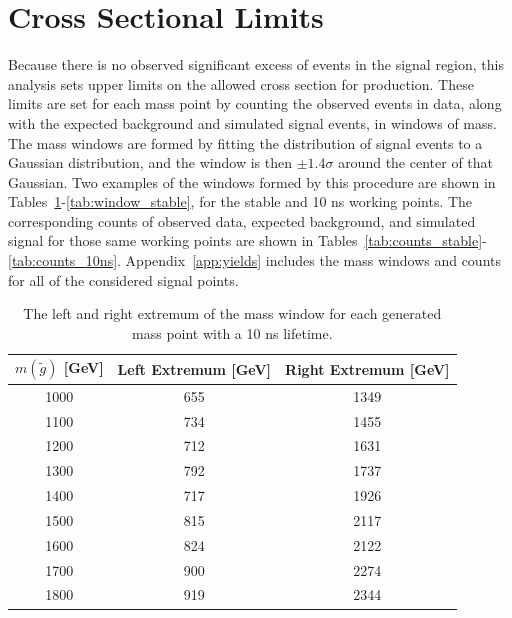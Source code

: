 
\section{Cross Sectional Limits}

Because there is no observed significant excess of events in the signal region, this analysis sets upper limits on the allowed cross section for \rhadron production.
These limits are set for each mass point by counting the observed events in data, along with the expected background and simulated signal events, in windows of mass.
The mass windows are formed by fitting the distribution of signal events to a Gaussian distribution, and the window is then $\pm 1.4\sigma$ around the center of that Gaussian.
Two examples of the windows formed by this procedure are shown in Tables~\ref{tab:window_10ns}-\ref{tab:window_stable}, for the stable and 10 ns working points.
The corresponding counts of observed data, expected background, and simulated signal for those same working points are shown in Tables~\ref{tab:counts_stable}-\ref{tab:counts_10ns}.
Appendix~\ref{app:yields} includes the mass windows and counts for all of the considered signal points.

\begin{table}[!htbp]
  \begin{center}
    \begin{tabular}{ccc}
        \hline
        $m(\tilde{g})$ [GeV]  & Left Extremum [GeV] & Right Extremum [GeV] \\
        \hline
        1000    & 655 & 1349 \\
        1100    & 734 & 1455 \\
        1200    & 712 & 1631 \\
        1300    & 792 & 1737 \\
        1400    & 717 & 1926 \\
        1500    & 815 & 2117 \\
        1600    & 824 & 2122 \\
        1700    & 900 & 2274 \\
        1800    & 919 & 2344 \\
        \hline
    \end{tabular}
  \end{center}
  \caption{The left and right extremum of the mass window for each generated mass point with a 10 ns lifetime.}
  \label{tab:window_10ns}
\end{table}


